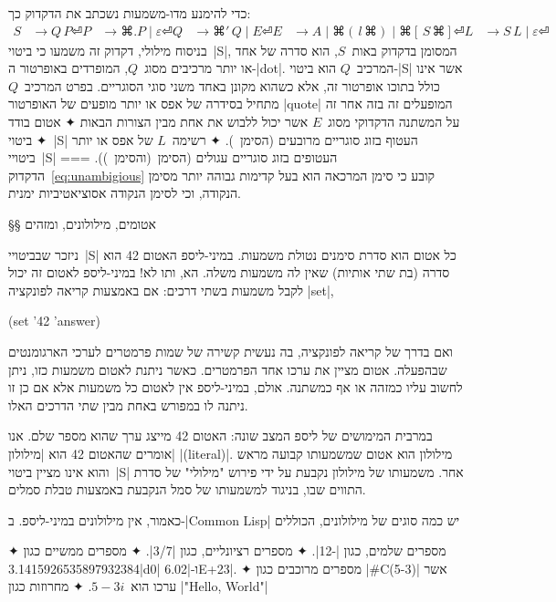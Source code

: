 כדי להימנע מדו-משמעות נשכתב את הדקדוק כך:
\newcommand \Or{\;|\;}
\newcommand \Then{\, }
\begin{equation}\label{eq:unambigious}
  \begin{split}
     S &→Q \, P ⏎
    P &→⌘{.} P \Or ε ⏎
    Q &→⌘{'} \Then Q \Or E ⏎
     E &→A \Or ⌘(\Then l \Then ⌘) \Or ⌘[ \Then S \Then ⌘] ⏎
     L &→S \Then L \Or ε ⏎
  \end{split}
\end{equation}
בניסוח מילולי, דקדוק זה משמעו כי ביטוי~\E|S|, המסומן בדקדוק באות~$S$, הוא סדרה
של אחד או יותר מרכיבים מסוג~$Q$, המופרדים באופרטור ה-\E|dot|.
המרכיב~$Q$ הוא ביטוי-\E|S| אשר אינו כולל בתוכו אופרטור זה, אלא כשהוא
מקונן באחד משני סוגי הסוגריים. בפרט המרכיב~$Q$ מתחיל בסידרה של אפס או יותר
מופעים של האופרטור \E|quote| המופעלים זה בזה אחר זה על המשתנה הדקדוקי
מסוג~$E$ אשר יכול
ללבוש את אחת מבין הצורות הבאות
✦ אטום בודד
✦ ביטוי~\E|S| העטוף בזוג סוגריים מרובעים (הסימן~\cc[ והסימן~\cc]).
✦ רשימה~$L$ של אפס או יותר ביטויי~\E|S| העטופים בזוג סוגריים עגולים (הסימן~\cc(והסימן~\cc)).
===
 הדקדוק~\ref{eq:unambigious} קובע כי סימן המרכאה הוא בעל קדימות גבוהה יותר מסימן
 הנקודה, וכי לסימן הנקודה אסוציאטיביות ימנית.

§§ אטומים, מילולונים, ומזהים

ניזכר שבביטויי~\E|S| כל אטום הוא סדרת סימנים נטולת משמעות. במיני-ליספ
האטום 42 הוא סדרה (בת שתי אותיות) שאין לה משמעות משלה. הא, ותו לא! במיני-ליספ
לאטום זה יכול לקבל משמעות בשתי דרכים: אם באמצעות קריאה לפונקציה
\E|set|,
\begin{LISP}
(set '42 'answer)
\end{LISP}
ואם בדרך של קריאה לפונקציה, בה נעשית קשירה של שמות פרמטרים לערכי הארגומנטים
שבהפעלה. אטום מציין את ערכו אחד הפרמטרים. כאשר ניתנת לאטום משמעות כזו, ניתן
לחשוב עליו כמזהה או אף כמשתנה. אולם, במיני-ליספ אין לאטום כל משמעות אלא אם כן
זו ניתנה לו במפורש באחת מבין שתי הדרכים האלו.

במרבית המימושים של ליספ המצב שונה: האטום 42 מייצג ערך שהוא מספר שלם. אנו אומרים
שהאטום 42 הוא \ע|מילולון| \E|(literal)|. מילולון הוא אטום שמשמעותו קבועה מראש
והוא אינו מציין ביטוי~\E|S| אחר. משמעותו של מילולון נקבעת על ידי פירוש "מילולי"
של סדרת התווים שבו, בניגוד למשמעותו של סמל הנקבעת באמצעות טבלת סמלים.

כאמור, אין מילולונים במיני-ליספ. ב-\E|Common Lisp| יש כמה סוגים של מילולונים,
הכוללים
\begin{enumerate}
  ✦ מספרים שלמים, כגון \T|-12|.
  ✦ מספרים רציונליים, כגון \T|3/7|.
  ✦ מספרים ממשיים כגון \T|3.1415926535897932384d0| ו-\T|6.02E+23|.
  ✦ מספרים מרוכבים כגון \T|#C(5-3)| אשר ערכו הוא~$5-3i$.
  ✦ מחרוזות כגון \T|"Hello, World"|
\end{enumerate}

